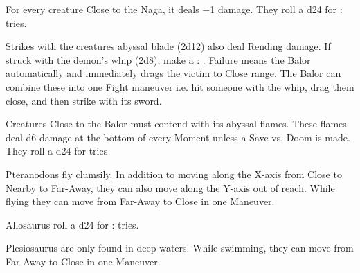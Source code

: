 {For every creature Close to the Naga, it deals +1 damage. They roll a d24 for \RB : \DEX tries.


\MONSTERBLOCK[
  Name=Balor,
  Link=monster-balor,
  MV=Base,
  WK=d3,
  DMG=2d12 / 2d8 1 Close +1 Nearby,
  HD=9,
  Power=Strong,
  Soak=4,
  Morale=n/a,
  Save=6,
  Extras={Frenzied}
]

Strikes with the creatures abyssal blade (2d12) also deal Rending damage.  If struck with the demon's whip (2d8), make a \RS : \DEX.  Failure means the Balor automatically and immediately drags the victim to Close range.  The Balor can combine these into one Fight maneuver i.e. hit someone with the whip, drag them close, and then strike with its sword.

Creatures Close to the Balor must contend with its abyssal flames.  These flames deal d6 damage at the bottom of every Moment unless a Save vs. Doom is made.
They roll a d24 for  \RB tries

\newpage



\MONSTERBLOCK[
  Name=Pteranodon,
  Link=monster-pteranodon,
  MV=Base,
  WK=d16,
  DMG=d12 1 Nearby*,
  HD=5,
  Power=Average,
  Soak=0,
  Morale=Cowardly,
  Save=3,
  Extras={}
]
Pteranodons fly clumsily. In addition to moving along the X-axis from Close to Nearby to Far-Away, they can also move along the Y-axis out of reach.  
While flying they can move from Far-Away to Close in one Maneuver.


\MONSTERBLOCK[
  Name=Triceratops,
  Link=monster-triceratops,
  MV=Slow,
  WK=d12,
  DMG=d6+d8 1 Close,
  HD=6,
  Power=Strong,
  Soak=4,
  Morale=Cowardly,
  Save=4,
  Extras={}
]

\MONSTERBLOCK[
  Name=Allosaurus,
  Link=monster-allosaurus,
  MV=Fast,
  WK=d12,
  DMG=2d8 2 Close,
  HD=6,
  Power=Average,
  Soak=2,
  Morale=Cowardly,
  Save=4,
  Extras={Swift, Keen}
]

Allosaurus roll a d24 for \RB : \DEX tries.

\MONSTERBLOCK[
  Name=Plesiosarus,
  Link=monster-plesiosarus,
  MV=Base,
  WK=d10,
  DMG=2d8 2 Close,
  HD=7,
  Power=Average,
  Soak=2,
  Morale=Cowardly,
  Save=4,
  Extras={}
]
Plesiosaurus are only found in deep waters.  While swimming, they can move from Far-Away to Close in one Maneuver.

\MONSTERBLOCK[
  Name=Tyrannosaurus Rex,
  Link=monster-tyrannosaurus-rex,
  MV=Base,
  WK=d6,
  DMG=2d12 3 Close,
  HD=8,
  Power=Strong,
  Soak=4,
  Morale=n/a,
  Save=5,
  Extras={Bloodthirsty,  Grudge}
]

}
